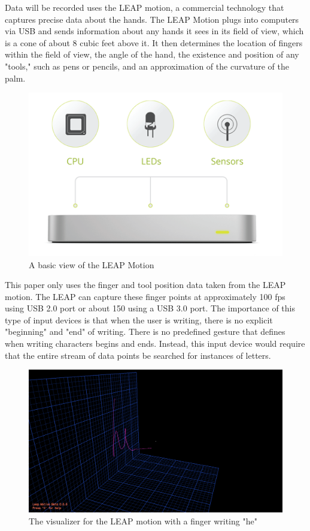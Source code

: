 Data will be recorded uses the LEAP motion, a commercial technology that captures precise data about the hands.
The LEAP Motion plugs into computers via USB and sends information about any hands it sees in its field of view, which is a cone of about 8 cubic feet above it.
It then determines the location of fingers within the field of view, the angle of the hand, the existence and position of any "tools," such as pens or pencils, and an approximation of the curvature of the palm.
\begin{figure}
  \begin{center}
  \includegraphics[width=\columnwidth]{images/leap.jpg}
  \caption{A basic view of the LEAP Motion}
  \label{fig:teaser}
  \end{center}  
\end{figure}
This paper only uses the finger  and tool position data taken from the LEAP motion. The LEAP can capture these finger points at approximately 100 fps using USB 2.0 port or about 150 using a USB 3.0 port.
The importance of this type of input devices is that when the user is writing, there is no explicit "beginning" and "end" of writing. There is no predefined gesture that defines when writing characters begins and ends. Instead, this input device would require that the entire stream of data points be searched for instances of letters. 
\begin{figure}
  \begin{center}
  \includegraphics[width=\columnwidth]{images/he-3d-2.PNG}
  \caption{The visualizer for the LEAP motion with a finger writing "he"}
  \label{fig:teaser}
  \end{center}  
\end{figure}

